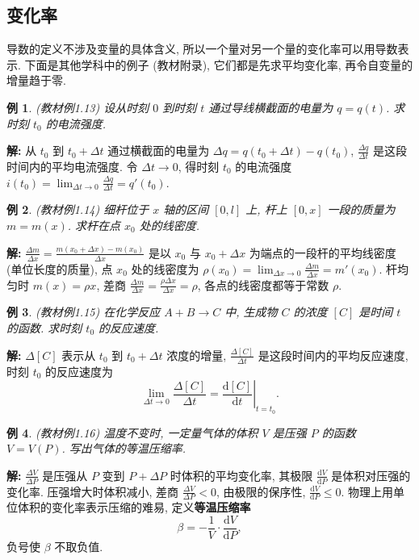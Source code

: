 \documentclass[UTF8,openany]{ctexbook}
\theoremstyle{chinesetextbook}
\newtheorem{example}{例}[section]
\newenvironment{cnsolution}{\par\indent\textbf{解:} \ignorespaces}{\par}
\newcommand{\dd}{\mathrm d}
\begin{document}
\subsection{变化率}
导数的定义不涉及变量的具体含义, 所以一个量对另一个量的变化率可以用导数表示. 下面是其他学科中的例子 (教材附录), 它们都是先求平均变化率, 再令自变量的增量趋于零.
\begin{example}\label{ex:c2-1-13}
\textnormal{(教材例1.13)} 设从时刻 $0$ 到时刻 $t$ 通过导线横截面的电量为 $q=q(t)$. 求时刻 $t_0$ 的电流强度.
\end{example}
\begin{cnsolution}
从 $t_0$ 到 $t_0+\Delta t$ 通过横截面的电量为 $\Delta q=q(t_0+\Delta t)-q(t_0)$, $\displaystyle\frac{\Delta q}{\Delta t}$ 是这段时间内的平均电流强度. 令 $\Delta t\to0$, 得时刻 $t_0$ 的电流强度 $\displaystyle i(t_0)=\lim_{\Delta t\to0}\frac{\Delta q}{\Delta t}=q'(t_0)$.
\end{cnsolution}
\begin{example}\label{ex:c2-1-14}
\textnormal{(教材例1.14)} 细杆位于 $x$ 轴的区间 $[0,l]$ 上, 杆上 $[0,x]$ 一段的质量为 $m=m(x)$. 求杆在点 $x_0$ 处的线密度.
\end{example}
\begin{cnsolution}
$\displaystyle\frac{\Delta m}{\Delta x}=\frac{m(x_0+\Delta x)-m(x_0)}{\Delta x}$ 是以 $x_0$ 与 $x_0+\Delta x$ 为端点的一段杆的平均线密度 (单位长度的质量), 点 $x_0$ 处的线密度为 $\displaystyle\rho(x_0)=\lim_{\Delta x\to0}\frac{\Delta m}{\Delta x}=m'(x_0)$. 杆均匀时 $m(x)=\rho x$, 差商 $\displaystyle\frac{\Delta m}{\Delta x}=\frac{\rho\Delta x}{\Delta x}=\rho$, 各点的线密度都等于常数 $\rho$.
\end{cnsolution}
\begin{example}\label{ex:c2-1-15}
\textnormal{(教材例1.15)} 在化学反应 $A+B\to C$ 中, 生成物 $C$ 的浓度 $[C]$ 是时间 $t$ 的函数. 求时刻 $t_0$ 的反应速度.
\end{example}
\begin{cnsolution}
$\Delta[C]$ 表示从 $t_0$ 到 $t_0+\Delta t$ 浓度的增量, $\displaystyle\frac{\Delta[C]}{\Delta t}$ 是这段时间内的平均反应速度, 时刻 $t_0$ 的反应速度为
\[
\lim_{\Delta t\to0}\frac{\Delta[C]}{\Delta t}=\left.\frac{\dd[C]}{\dd t}\right|_{t=t_0}.
\]
\end{cnsolution}
\begin{example}\label{ex:c2-1-16}
\textnormal{(教材例1.16)} 温度不变时, 一定量气体的体积 $V$ 是压强 $P$ 的函数 $V=V(P)$. 写出气体的等温压缩率.
\end{example}
\begin{cnsolution}
$\displaystyle\frac{\Delta V}{\Delta P}$ 是压强从 $P$ 变到 $P+\Delta P$ 时体积的平均变化率, 其极限 $\displaystyle\frac{\dd V}{\dd P}$ 是体积对压强的变化率. 压强增大时体积减小, 差商 $\displaystyle\frac{\Delta V}{\Delta P}<0$, 由极限的保序性, $\displaystyle\frac{\dd V}{\dd P}\le0$. 物理上用单位体积的变化率表示压缩的难易, 定义\textbf{等温压缩率}
\[
\beta=-\frac1V\cdot\frac{\dd V}{\dd P},
\]
负号使 $\beta$ 不取负值.
\end{cnsolution}
\end{document}
